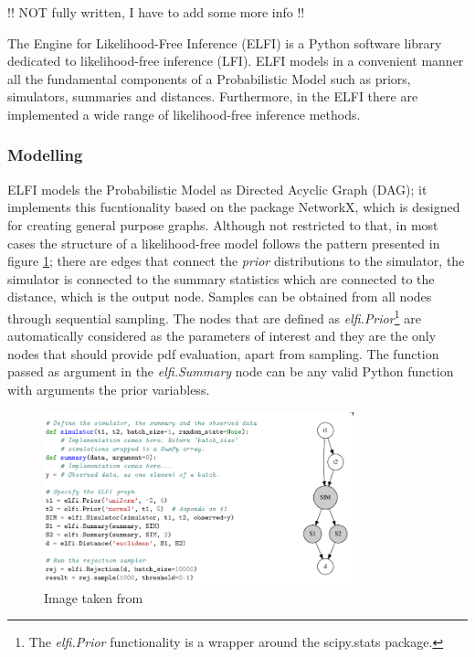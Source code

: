!! NOT fully written, I have to add some more info !!

The Engine for Likelihood-Free Inference (ELFI) \cite{1708.00707} is a Python software library dedicated to likelihood-free inference (LFI). ELFI models in a convenient manner all the fundamental components of a Probabilistic Model such as priors, simulators, summaries and distances. Furthermore, in the ELFI there are implemented a wide range of likelihood-free inference methods.

\subsubsection{Modelling}
\label{sec:modelling}

ELFI models the Probabilistic Model as Directed Acyclic Graph (DAG);
it implements this fucntionality based on the package NetworkX, which
is designed for creating general purpose graphs. Although not
restricted to that, in most cases the structure of a likelihood-free
model follows the pattern presented in figure \ref{fig:elfi-model};
there are edges that connect the \textit{prior} distributions to the
simulator, the simulator is connected to the summary statistics which
are connected to the distance, which is the output node. Samples can
be obtained from all nodes through sequential sampling. The nodes that
are defined as \textit{elfi.Prior}\footnote{The \textit{elfi.Prior}
  functionality is a wrapper around the scipy.stats package.} are
automatically considered as the parameters of interest and they are
the only nodes that should provide pdf evaluation, apart from
sampling. The function passed as argument in the \textit{elfi.Summary}
node can be any valid Python function with arguments the prior
variabless.

\begin{figure}[!ht]
    \begin{center}
      \includegraphics[width=0.8\textwidth]{./images/chapter2/elfi.png}
    \end{center}
    \caption{Image taken from \cite{1708.00707}}
    \label{fig:elfi-model}
\end{figure}


